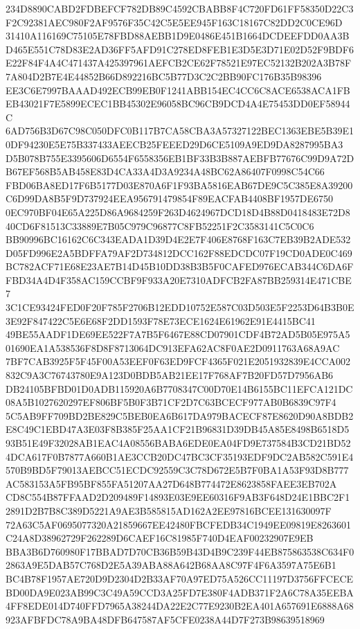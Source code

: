 \documentclass[UTF8,fontset=fandol,zihao=-4,a4paper]{ctexart}
\begin{document}
{{234D8890CABD2FDBEFCF782DB89C4592CBABB8F4C720FD61FF58350D22C3F2C92381AEC980F2AF9576F35C42C5E5EE945F163C18167C82DD2C0CE96D
31410A116169C75105E78FBD88AEBB1D9E0486E451B1664DCDEEFDD0AA3BD465E551C78D83E2AD36FF5AFD91C278ED8FEB1E3D5E3D71E02D52F9BDF6
E22F84F4A4C471437A425397961AEFCB2CE62F78521E97EC52132B202A3B78F7A804D2B7E4E44852B66D892216BC5B77D3C2C2BB90FC176B35B98396
EE3C6E7997BAAAD492ECB99EB0F1241ABB154EC4CC6C8ACE6538ACA1FBEB43021F7E5899ECEC1BB45302E96058BC96CB9DCD4A4E75453DD0EF58944C
6AD756B3D67C98C050DFC0B117B7CA58CBA3A57327122BEC1363EBE5B39E10DF94230E5E75B337433AEECB25FEEED29D6CE5109A9ED9DA8287995BA3
D5B078B755E3395606D6554F6558356EB1BF33B3B887AEBFB77676C99D9A72DB67EF568B5AB458E83D4CA33A4D3A9234A48BC62A86407F0998C54C66
FBD06BA8ED17F6B5177D03E870A6F1F93BA5816EAB67DE9C5C385E8A39200C6D99DA8B5F9D737924EEA956791479854F89EACFAB4408BF1957DE6750
0EC970BF04E65A225D86A9684259F263D4624967DCD18D4B88D0418483E72D840CD6F81513C33889E7B05C979C96877C8FB52251F2C3583141C5C0C6
BB90996BC16162C6C343EADA1D39D4E2E7F406E8768F163C7EB39B2ADE532D05FD996E2A5BDFFA79AF2D734812DCC162F88EDCDC07F19CD0ADE0C469
BC782ACF71E68E23AE7B14D45B10DD38B3B5F0CAFED976ECAB344C6DA6FFBD34A4D4F358AC159CCBF9F933A20E7310ADFCB2FA87BB259314E471CBE7
3C1CE93424FED0F20F785F2706B12EDD10752E587C03D503E5F2253D64B3B0E3E92F847422C5E6E68F2DD1593F78E73ECE1624E61962E91E4415BC41
49BE55AADF1DE69EE522F7A7B5F6467E88CD07901CDF4B72AD5B05E975A501690EA1A538536F8D8F8713064DC913EFA62AC8F0AE2D0911763A68A9AC
7BF7CAB3925F5F45F00A53EEF0F63ED9FCF4365F021E2051932839E4CCA002832C9A3C76743780E9A123D0BDB5AB21EE17F768AF7B20FD57D7956AB6
DB24105BFBD01D0ADB115920A6B7708347C00D70E14B6155BC11EFCA121DC08A5B1027620297EF806BF5B0F3B71CF2D7C63BCECF977AB0B6839C97F4
5C5AB9FF709BD2BE829C5BEB0EA6B617DA979BACECF87E8620D90A8BDB2E8C49C1EBD47A3E03F8B385F25AA1CF21B96831D39DB45A85E8498B6518D5
93B51E49F32028AB1EAC4A08556BABA6EDE0EA04FD9E737584B3CD21BD524DCA617F0B7877A660B1AE3CCB20DC47BC3CF35193EDF9DC2AB582C591E4
570B9BD5F79013AEBCC51ECDC92559C3C78D672E5B7F0BA1A53F93D8B777AC583153A5FB95BF855FA51207AA27D648B774472E8623858FAEE3EB702A
CD8C554B87FFAAD2D209489F14893E03E9EE60316F9AB3F648D24E1BBC2F12891D2B7B8C389D5221A9AE3B585815AD162A2EE97816BCEE131630097F
72A63C5AF0695077320A21859667EE42480FBCFEDB34C1949EE09819E8263601C24A8D38962729F262289D6CAEF16C81985F740D4EAF00232907E9EB
BBA3B6D760980F17BBAD7D70CB36B59B43D4B9C239F44EB875863538C634F02863A9E5DAB57C768D2E5A39ABA88A642B68AA8C97F4F6A3597A75E6B1
BC4B78F1957AE720D9D2304D2B33AF70A97ED75A526CC11197D3756FFCECEBD00DA9E023AB99C3C49A59CCD3A25FD7E380F4ADB371F2A6C78A35EEBA
4FF8EDE014D740FFD7965A38244DA22E2C77E9230B2EA401A657691E6888A68923AFBFDC78A9BA48DFB647587AF5CFE0238A44D7F273B98639518969
}}
\end{document}
